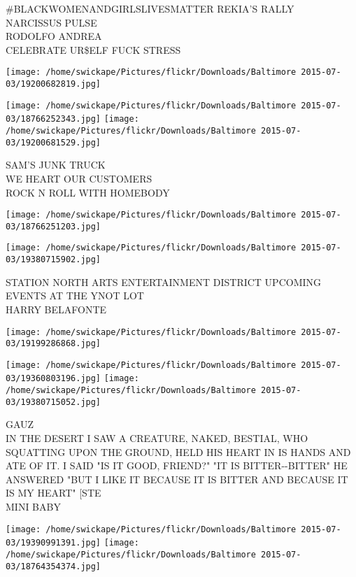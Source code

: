 \documentclass[10pt,letterpaper]{article}
\begin{document}
\#BLACKWOMENANDGIRLSLIVESMATTER REKIA'S RALLY\\
NARCISSUS PULSE\\
RODOLFO ANDREA\\
CELEBRATE UR\$ELF FUCK STRESS\\
\pagebreak

\texttt{[image: /home/swickape/Pictures/flickr/Downloads/Baltimore 2015-07-03/19200682819.jpg]}

\vspace{0.25in}
\texttt{[image: /home/swickape/Pictures/flickr/Downloads/Baltimore 2015-07-03/18766252343.jpg]}
\texttt{[image: /home/swickape/Pictures/flickr/Downloads/Baltimore 2015-07-03/19200681529.jpg]}

SAM'S JUNK TRUCK\\
WE HEART OUR CUSTOMERS\\
ROCK N ROLL WITH HOMEBODY\\
\pagebreak

\texttt{[image: /home/swickape/Pictures/flickr/Downloads/Baltimore 2015-07-03/18766251203.jpg]}

\vspace{0.25in}
\texttt{[image: /home/swickape/Pictures/flickr/Downloads/Baltimore 2015-07-03/19380715902.jpg]}

STATION NORTH ARTS ENTERTAINMENT DISTRICT UPCOMING EVENTS AT THE YNOT LOT\\
HARRY BELAFONTE\\
\pagebreak

\texttt{[image: /home/swickape/Pictures/flickr/Downloads/Baltimore 2015-07-03/19199286868.jpg]}

\vspace{0.25in}
\texttt{[image: /home/swickape/Pictures/flickr/Downloads/Baltimore 2015-07-03/19360803196.jpg]}
\texttt{[image: /home/swickape/Pictures/flickr/Downloads/Baltimore 2015-07-03/19380715052.jpg]}

GAUZ\\
IN THE DESERT I SAW A CREATURE, NAKED, BESTIAL, WHO SQUATTING UPON THE GROUND, HELD HIS HEART IN IS HANDS AND ATE OF IT.  I SAID "IS IT GOOD, FRIEND?"  "IT IS BITTER{-}{-}BITTER" HE ANSWERED "BUT I LIKE IT BECAUSE IT IS BITTER AND BECAUSE IT IS MY HEART" {[}STE\\
MINI BABY\\
\pagebreak

\texttt{[image: /home/swickape/Pictures/flickr/Downloads/Baltimore 2015-07-03/19390991391.jpg]}
\texttt{[image: /home/swickape/Pictures/flickr/Downloads/Baltimore 2015-07-03/18764354374.jpg]}
\end{document}
